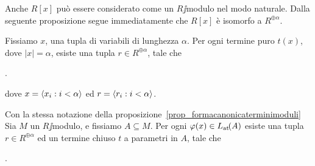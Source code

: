 Anche $R[x]$ pu\`o essere considerato come un $R\jj$modulo nel modo naturale. Dalla seguente proposizione segue immediatamente che $R[x]$ \`e isomorfo a $R^{\oplus\!\alpha}$.

% 
% 

\begin{proposition}
\label{prop_formacanonicaterminimoduli}
Fissiamo $x$, una tupla di variabili di lunghezza $\alpha$. Per ogni termine puro $t(x)$, dove $|x|=\alpha$, esiste una tupla $r\in R^{\oplus\alpha}$, tale che 

.

dove $x=\langle x_i:i<\alpha\rangle$ ed $r=\langle r_i:i<\alpha\rangle$.\QED
\end{proposition}

% 
% 
% 


\begin{corollary}
\label{corol_formacanonicaterminimoduli}
Con la stessa notazione della proposizione~\ref{prop_formacanonicaterminimoduli} Sia $M$ un $R\jj$modulo, e fissiamo $A\subseteq M$. Per ogni $\varphi(x)\in L_{\tiny\rm at}\hskip-.3ex(A)$ esiste una tupla $r\in R^{\oplus\alpha}$ ed un termine chiuso $t$ a parametri in $A$, tale che 

.\QED

\end{corollary}

